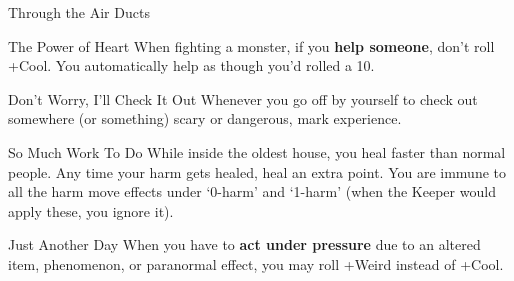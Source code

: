 {\begin{move}{Through the Air Ducts}
\end{move}%
\br[1mm]
%
\begin{move}{The Power of Heart}
When fighting a monster, if you \textbf{help someone}, don’t roll +Cool. You automatically help as though you’d rolled a 10.
\end{move}%
\br[1mm]
%
\begin{move}{Don't Worry, I'll Check It Out}
Whenever you go off by yourself to check out somewhere (or something) scary or dangerous, mark experience.
\end{move}%
\br[1mm]
%
\begin{move}{So Much Work To Do}
While inside the oldest house, you heal faster than normal people. Any time your harm gets healed, heal an extra point. You are immune to all the harm move effects under ‘0-harm’ and ‘1-harm’ (when the Keeper would apply these, you ignore it).
\end{move}%
\br[1mm]
%
\begin{move}{Just Another Day}
When you have to \textbf{act under pressure} due to an altered item, phenomenon, or paranormal effect, you may roll +Weird instead of +Cool.
\end{move}%
\br[1mm]
%
}\pagebreak%
%

